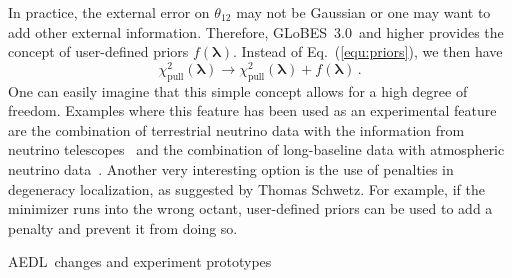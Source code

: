 \documentclass[12pt,a4paper]{article}
\makeatletter
\renewcommand{\section}{\@startsection{section}{1}{0em}{-\baselineskip}%
{\baselineskip}{\normalfont\large\bfseries}}
\newcommand{\eq}{Eq.}
\newcommand{\GLOBESN}{{\sf GLoBES~3.0}}
\newcommand{\AEDL}{{\sf AEDL}}
\newcommand{\equ}[1]{\eq~(\ref{equ:#1})}
\makeatother
\begin{document}
In practice, the external error on $\theta_{12}$ may not be Gaussian or one may
want to add other external information. Therefore,
\GLOBESN\ and higher provides the concept of user-defined priors  $f(\boldsymbol{\lambda})$. 
Instead of \equ{priors}, we then have
\begin{equation}
 \chi^2_{\mathrm{pull}}(\boldsymbol{\lambda}) \rightarrow \chi^2_{\mathrm{pull}}(\boldsymbol{\lambda})  + f(\boldsymbol{\lambda}) \, .
\label{equ:userpriors}
\end{equation}
One can easily imagine that this simple concept allows for a high degree of freedom. Examples where
this feature has been used as an experimental feature are the combination of terrestrial neutrino
data with the information from neutrino telescopes~\cite{Winter:2006ce} and the combination of long-baseline data with atmospheric neutrino data~\cite{Huber:2005ep,Campagne:2006yx}.
Another very interesting option is the use of penalties in degeneracy localization, as suggested by Thomas
Schwetz. For example, if the minimizer runs into the wrong octant, user-defined priors can be
used to add a penalty and prevent it from doing so.

\section{\AEDL\ changes and experiment prototypes}
\end{document}
